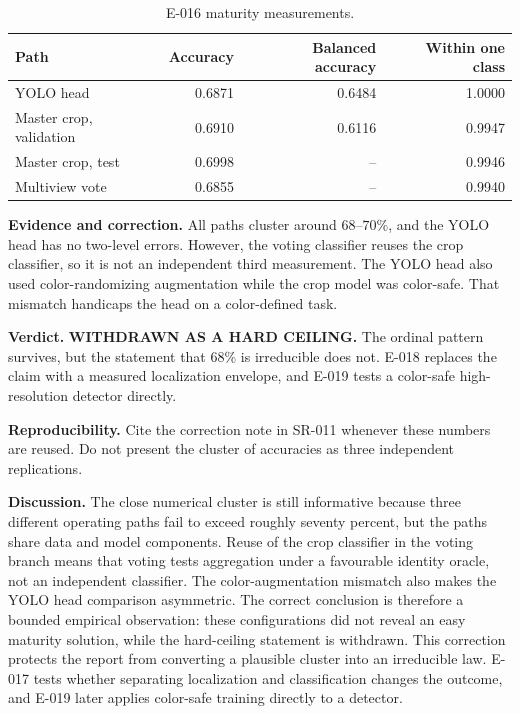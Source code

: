 \documentclass[preprint,12pt]{elsarticle}
\begin{document}
\begin{table}[H]
\centering
\caption{E-016 maturity measurements.}
\label{tab:e016}
\begin{tabular}{lrrr}
\toprule
Path & Accuracy & Balanced accuracy & Within one class\\
\midrule
YOLO head & 0.6871 & 0.6484 & 1.0000\\
Master crop, validation & 0.6910 & 0.6116 & 0.9947\\
Master crop, test & 0.6998 & -- & 0.9946\\
Multiview vote & 0.6855 & -- & 0.9940\\
\bottomrule
\end{tabular}
\end{table}

\textbf{Evidence and correction.} All paths cluster around \(68\)--\(70\%\),
and the YOLO head has no two-level errors. However, the voting classifier
reuses the crop classifier, so it is not an independent third measurement.
The YOLO head also used color-randomizing augmentation while the crop model
was color-safe. That mismatch handicaps the head on a color-defined task.

\textbf{Verdict.} \textbf{WITHDRAWN AS A HARD CEILING.} The ordinal pattern
survives, but the statement that \(68\%\) is irreducible does not. E-018
replaces the claim with a measured localization envelope, and E-019 tests a
color-safe high-resolution detector directly.

\textbf{Reproducibility.} Cite the correction note in SR-011 whenever these
numbers are reused. Do not present the cluster of accuracies as three
independent replications.

\textbf{Discussion.} The close numerical cluster is still informative because
three different operating paths fail to exceed roughly seventy percent, but
the paths share data and model components. Reuse of the crop classifier in
the voting branch means that voting tests aggregation under a favourable
identity oracle, not an independent classifier. The color-augmentation
mismatch also makes the YOLO head comparison asymmetric. The correct
conclusion is therefore a bounded empirical observation: these configurations
did not reveal an easy maturity solution, while the hard-ceiling statement
is withdrawn. This correction protects the report from converting a
plausible cluster into an irreducible law. E-017 tests whether separating
localization and classification changes the outcome, and E-019 later applies
color-safe training directly to a detector.
\end{document}
